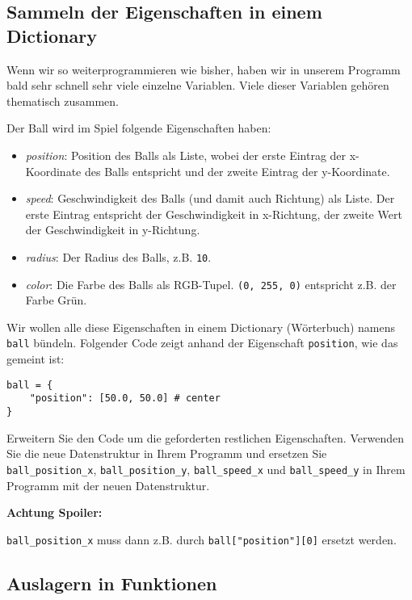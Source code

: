 \documentclass[
]{scrartcl}
\providecommand{\tightlist}{%
  \setlength{\itemsep}{0pt}\setlength{\parskip}{0pt}}
\begin{document}
\hypertarget{sammeln-der-eigenschaften-in-einem-dictionary}{%
\subsection{Sammeln der Eigenschaften in einem
Dictionary}\label{sammeln-der-eigenschaften-in-einem-dictionary}}

Wenn wir so weiterprogrammieren wie bisher, haben wir in unserem
Programm bald sehr schnell sehr viele einzelne Variablen. Viele dieser
Variablen gehören thematisch zusammen.

Der Ball wird im Spiel folgende Eigenschaften haben:

\begin{itemize}
\tightlist
\item
  \emph{position}: Position des Balls als Liste, wobei der erste Eintrag
  der x-Koordinate des Balls entspricht und der zweite Eintrag der
  y-Koordinate.
\item
  \emph{speed}: Geschwindigkeit des Balls (und damit auch Richtung) als
  Liste. Der erste Eintrag entspricht der Geschwindigkeit in x-Richtung,
  der zweite Wert der Geschwindigkeit in y-Richtung.
\item
  \emph{radius}: Der Radius des Balls, z.B. \texttt{10}.
\item
  \emph{color}: Die Farbe des Balls als RGB-Tupel.
  \texttt{(0,\ 255,\ 0)} entspricht z.B. der Farbe Grün.
\end{itemize}

Wir wollen alle diese Eigenschaften in einem Dictionary (Wörterbuch)
namens \texttt{ball} bündeln. Folgender Code zeigt anhand der
Eigenschaft \texttt{position}, wie das gemeint ist:

\begin{verbatim}
ball = {
    "position": [50.0, 50.0] # center
}
\end{verbatim}

 Erweitern Sie den Code um die geforderten restlichen
Eigenschaften. Verwenden Sie die neue Datenstruktur in Ihrem Programm
und ersetzen Sie \texttt{ball\_position\_x}, \texttt{ball\_position\_y},
\texttt{ball\_speed\_x} und \texttt{ball\_speed\_y} in Ihrem Programm
mit der neuen Datenstruktur.

\textbf{Achtung Spoiler:}

\texttt{ball\_position\_x} muss dann z.B. durch
\texttt{ball{[}"position"{]}{[}0{]}} ersetzt werden.

\hypertarget{auslagern-in-funktionen}{%
\subsection{Auslagern in Funktionen}\label{auslagern-in-funktionen}}
\end{document}

